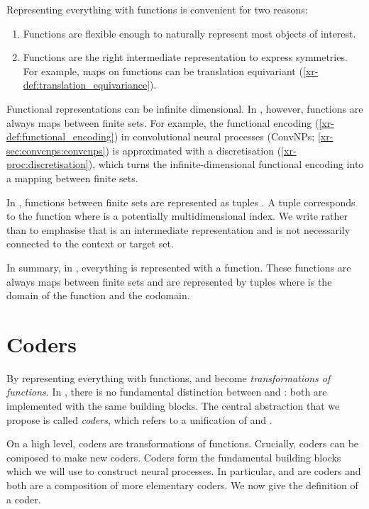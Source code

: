 \documentclass[12pt, twoside]{report}
\newcommand{\xrprefix}[1]{xr-#1}
\begin{document}
Representing everything with functions is convenient for two reasons:
\begin{enumerate}
    \item 
        Functions are flexible enough to naturally represent most objects of interest.
    \item 
        Functions are the right intermediate representation to express symmetries.
        For example, maps on functions can be translation equivariant (\cref{\xrprefix{def:translation_equivariance}}).
\end{enumerate}

Functional representations can be infinite dimensional.
In , however, functions are always maps between finite sets.
For example, the functional encoding (\cref{\xrprefix{def:functional_encoding}}) in convolutional neural processes (ConvNPs; \cref{\xrprefix{sec:convcnps:convcnps}}) is approximated with a discretisation (\cref{\xrprefix{proc:discretisation}}), which turns the infinite-dimensional functional encoding into a mapping between finite sets.

In , functions between finite sets are represented as tuples .
A tuple  corresponds to the function  where  is a potentially multidimensional index.
We write  rather than  to emphasise that  is an intermediate representation and is not necessarily connected to the context or target set.

In summary, in , everything is represented with a function.
These functions are always maps between finite sets and are represented by tuples  where  is the domain of the function and  the codomain.

\section{Coders}
\label{sec:software:coders}

By representing everything with functions,  and  become \emph{transformations of functions}.
In , there is no fundamental distinction between  and :
both are implemented with the same building blocks.
The central abstraction that we propose is called \emph{coders}, which refers to a unification of  and .

On a high level, coders are transformations of functions.
Crucially, coders can be composed to make new coders.
Coders form the fundamental building blocks which we will use to construct neural processes.
In particular,  and  are coders and both are a composition of more elementary coders.
We now give the definition of a coder.
\end{document}
